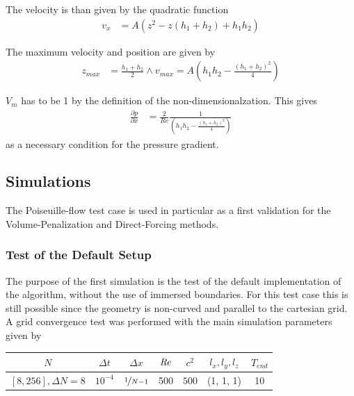 The velocity is than given by the quadratic function
\begin{align}
\label{vali:pflow_theosol}
v_x &= A(z^2 - z(h_1 + h_2) + h_1h_2)
\end{align}

The maximum velocity and position are given by
\begin{align}
z_{max} &= \frac{h_1+h_2}{2} \wedge v_{max} = A\left(h_1h_2 - \frac{(h_1 + h_2)^2}{4}\right)
\end{align}

$V_{m}$ has to be 1 by the definition of the non-dimensionalzation. This gives
\begin{align}
\frac{\partial p}{\partial x} &= \frac{2}{Re}\frac{1}{\left(h_1h_2 - \frac{(h_1+h_2)^2}{4} \right)}
\end{align}
as a necessary condition for the pressure gradient.

\subsection{Simulations}

The Poiseuille-flow test case is used in particular as a first validation
for the Volume-Penalization and Direct-Forcing methods.

\subsubsection{Test of the Default Setup}

The purpose of the first simulation is the test of the default
implementation of the algorithm, without the use of immersed boundaries.
For this test case this is still possible since the geometry is non-curved
and parallel to the cartesian grid.
A grid convergence test was performed with the main simulation parameters given by

\begin{center}
\vspace*{0.7ex}
\begin{tabular}{c|c|c|c|c|c|c }
 $ N  $                   & $\Delta t$ & $\Delta x$            & $\mbox{\textit{Re}}$  & $c^2$   & $l_x, l_y, l_z$ & $T_{end}$\\
\hline
 $[8, 256], \Delta N = 8 $& $10^{-4}$ & $\nicefrac{1}{N - 1}$ & 500     & $500$   & (1, 1, 1)       & 10\\
\end{tabular}
\vspace*{0.7ex}
\end{center}

